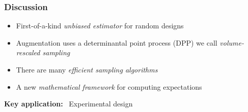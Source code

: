 \documentclass{beamer}
\begin{document}
\begin{frame}
  \frametitle{Discussion}

  \begin{itemize}
  \item First-of-a-kind \emph{unbiased estimator} for random designs\\[4mm]
    \pause
  \item Augmentation uses a determinantal point process (DPP) we call \emph{volume-rescaled sampling}\\[4mm]
    \pause
  \item There are many \emph{efficient sampling algorithms}\\[4mm]
    \pause
  \item A new \emph{mathematical framework} for computing expectations
  \end{itemize}\pause\vspace{6mm}
  
  \textbf{Key application:} \ Experimental design
\end{frame}
\end{document}
